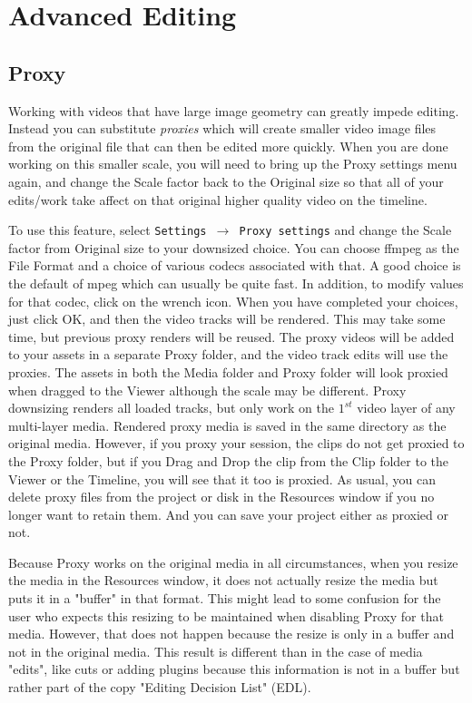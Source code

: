 \chapter{Advanced Editing}%
\label{cha:advanced_editing}

\section{Proxy}%
\label{sec:proxy}

Working with videos that have large image geometry can greatly impede editing.  Instead you can substitute \textit{proxies} which will create smaller video image files from the original file that can then be edited more quickly.   When you are done working on this smaller scale, you will need to bring up the Proxy settings menu again, and change the Scale factor back to the Original size so that all of your edits/work take affect on that original higher quality video on the timeline.  

To use this feature, select \texttt{Settings $\rightarrow$ Proxy settings} and change the Scale factor from Original size to your downsized choice.  You can choose ffmpeg as the File Format and a choice of various codecs associated with that.  A good choice is the default of mpeg which can usually be quite fast.  In addition, to modify values for that codec, click on the wrench icon.  When you have completed your choices, just click OK, and then the video tracks will be rendered. This may take some time, but previous proxy renders will be reused.  
The proxy videos will be added to your assets in a separate Proxy folder, and the video track edits will use the proxies.
The assets in both the Media folder and Proxy folder will look proxied when dragged to the Viewer although the scale may be different.
Proxy downsizing renders all loaded tracks, but only work on the $1^{st}$ video layer of any multi-layer media.  Rendered proxy media is saved in the same directory as the original media.
However, if you proxy your session, the clips do not get proxied to the Proxy folder, but if you Drag and Drop the clip from the Clip folder to the Viewer or the Timeline, you will see that it too is proxied.  
As usual, you can delete proxy files from the project or disk in the Resources window if you no longer want to retain them.
And you can save your project either as proxied or not.

Because Proxy works on the original media in all circumstances, when you resize the
media in the Resources window, it does not actually resize the media but puts it in
a "buffer" in that format. This might lead to some confusion for the user who
expects this resizing to be maintained when disabling Proxy for that media. However,
that does not happen because the resize is only in a buffer and not in the original
media. This result is different than in the case of media "edits", like cuts or
adding plugins because this information is not in a buffer but rather part of the
copy "Editing Decision List" (EDL).

